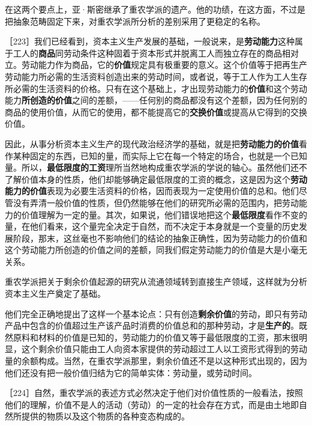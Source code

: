 在这两个要点上，亚·斯密继承了重农学派的遗产。他的功绩，在这方面，不过是把抽象范畴固定下来，对重农学派所分析的差别采用了更稳定的名称。

［223］我们已经看到，资本主义生产发展的基础，一般说来，是\textbf{劳动能力}这种属于工人的\textbf{商品}同劳动条件这种固着于资本形式并脱离工人而独立存在的商品相对立。劳动能力作为商品，它的\textbf{价值}规定具有极重要的意义。这个价值等于把再生产劳动能力所必需的生活资料创造出来的劳动时间，或者说，等于工人作为工人生存所必需的生活资料的价格。只有在这个基础上，才出现劳动能力的\textbf{价值}和这个劳动能力\textbf{所创造的价值}之间的差额，——任何别的商品都没有这个差额，因为任何别的商品的使用价值，从而它的使用，都不能提高它的\textbf{交换价值}或提高从它得到的交换价值。

因此，从事分析资本主义生产的现代政治经济学的基础，就是把\textbf{劳动能力的价值}看作某种固定的东西，已知的量，而实际上它在每一个特定的场合，也就是一个已知量。所以，\textbf{最低限度的工资}理所当然地构成重农学派的学说的轴心。虽然他们还不了解价值本身的性质，他们却能够确定最低限度的工资的概念，这是因为这个\textbf{劳动能力的价值}表现为必要生活资料的价格，因而表现为一定使用价值的总和。他们尽管没有弄清一般价值的性质，但仍然能够在他们的研究所必需的范围内，把劳动能力的价值理解为一定的量。其次，如果说，他们错误地把这个\textbf{最低限度}看作不变的量，在他们看来，这个量完全决定于自然，而不决定于本身就是一个变量的历史发展阶段，那末，这丝毫也不影响他们的结论的抽象正确性，因为劳动能力的价值和这个劳动能力所创造的价值之间的差额，同我们假定劳动能力的价值是大是小毫无关系。

重农学派把关于剩余价值起源的研究从流通领域转到直接生产领域，这样就为分析资本主义生产奠定了基础。

他们完全正确地提出了这样一个基本论点：只有创造\textbf{剩余价值}的劳动，即只有劳动产品中包含的价值超过生产该产品时消费的价值总和的那种劳动，才是\textbf{生产的}。既然原料和材料的价值是已知的，劳动能力的价值又等于最低限度的工资，那末很明显，这个剩余价值只能由工人向资本家提供的劳动超过工人以工资形式得到的劳动量的余额构成。当然，在重农学派那里，剩余价值还不是以这种形式出现的，因为他们还没有把一般价值归结为它的简单实体：劳动量，或劳动时间。

［224］自然，重农学派的表述方式必然决定于他们对价值性质的一般看法，按照他们的理解，价值不是人的活动（劳动）的一定的社会存在方式，而是由土地即自然所提供的物质以及这个物质的各种变态构成的。

